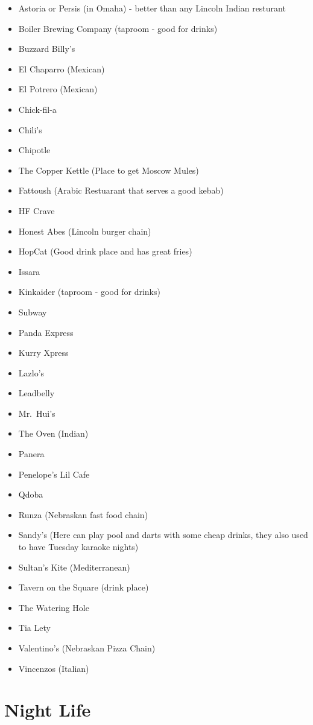 \documentclass[
  12pt,
]{book}
\providecommand{\tightlist}{%
  \setlength{\itemsep}{0pt}\setlength{\parskip}{0pt}}
\begin{document}
\begin{itemize}
\tightlist
\item
  Astoria or Persis (in Omaha) - better than any Lincoln Indian resturant
\item
  Boiler Brewing Company (taproom - good for drinks)
\item
  Buzzard Billy's
\item
  El Chaparro (Mexican)
\item
  El Potrero (Mexican)
\item
  Chick-fil-a
\item
  Chili's
\item
  Chipotle
\item
  The Copper Kettle (Place to get Moscow Mules)
\item
  Fattoush (Arabic Restuarant that serves a good kebab)
\item
  HF Crave
\item
  Honest Abes (Lincoln burger chain)
\item
  HopCat (Good drink place and has great fries)
\item
  Issara
\item
  Kinkaider (taproom - good for drinks)
\item
  Subway
\item
  Panda Express
\item
  Kurry Xpress
\item
  Lazlo's
\item
  Leadbelly
\item
  Mr.~Hui's
\item
  The Oven (Indian)
\item
  Panera
\item
  Penelope's Lil Cafe
\item
  Qdoba
\item
  Runza (Nebraskan fast food chain)
\item
  Sandy's (Here can play pool and darts with some cheap drinks, they also used to have Tuesday karaoke nights)
\item
  Sultan's Kite (Mediterranean)
\item
  Tavern on the Square (drink place)
\item
  The Watering Hole
\item
  Tia Lety
\item
  Valentino's (Nebraskan Pizza Chain)
\item
  Vincenzos (Italian)
\end{itemize}

\hypertarget{night-life}{%
\section{Night Life}\label{night-life}}
\end{document}
